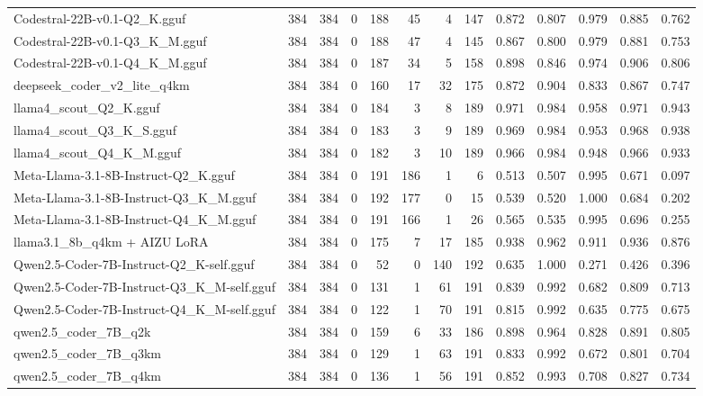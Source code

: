 \begin{table}[htbp]
{\begin{tabular}{lrrrrrrrrrrrr}
    Codestral-22B-v0.1-Q2\_K.gguf & 384 & 384 & 0 & 188 & 45 & 4 & 147 & 0.872 & 0.807 & 0.979 & 0.885 & 0.762 \\
    Codestral-22B-v0.1-Q3\_K\_M.gguf & 384 & 384 & 0 & 188 & 47 & 4 & 145 & 0.867 & 0.800 & 0.979 & 0.881 & 0.753 \\
    Codestral-22B-v0.1-Q4\_K\_M.gguf & 384 & 384 & 0 & 187 & 34 & 5 & 158 & 0.898 & 0.846 & 0.974 & 0.906 & 0.806 \\
    deepseek\_coder\_v2\_lite\_q4km & 384 & 384 & 0 & 160 & 17 & 32 & 175 & 0.872 & 0.904 & 0.833 & 0.867 & 0.747 \\
    llama4\_scout\_Q2\_K.gguf & 384 & 384 & 0 & 184 & 3 & 8 & 189 & 0.971 & 0.984 & 0.958 & 0.971 & \cellcolor{green!20}0.943 \\
    llama4\_scout\_Q3\_K\_S.gguf & 384 & 384 & 0 & 183 & 3 & 9 & 189 & 0.969 & 0.984 & 0.953 & 0.968 & 0.938 \\
    llama4\_scout\_Q4\_K\_M.gguf & 384 & 384 & 0 & 182 & 3 & 10 & 189 & 0.966 & 0.984 & 0.948 & 0.966 & 0.933 \\
    Meta-Llama-3.1-8B-Instruct-Q2\_K.gguf & 384 & 384 & 0 & 191 & 186 & 1 & 6 & 0.513 & 0.507 & 0.995 & 0.671 & 0.097 \\
    Meta-Llama-3.1-8B-Instruct-Q3\_K\_M.gguf & 384 & 384 & 0 & 192 & 177 & 0 & 15 & 0.539 & 0.520 & 1.000 & 0.684 & 0.202 \\
    Meta-Llama-3.1-8B-Instruct-Q4\_K\_M.gguf & 384 & 384 & 0 & 191 & 166 & 1 & 26 & 0.565 & 0.535 & 0.995 & 0.696 & 0.255 \\
    llama3.1\_8b\_q4km + AIZU LoRA & 384 & 384 & 0 & 175 & 7 & 17 & 185 & 0.938 & 0.962 & 0.911 & 0.936 & 0.876 \\
    Qwen2.5-Coder-7B-Instruct-Q2\_K-self.gguf & 384 & 384 & 0 & 52 & 0 & 140 & 192 & 0.635 & 1.000 & 0.271 & 0.426 & 0.396 \\
    Qwen2.5-Coder-7B-Instruct-Q3\_K\_M-self.gguf & 384 & 384 & 0 & 131 & 1 & 61 & 191 & 0.839 & 0.992 & 0.682 & 0.809 & 0.713 \\
    Qwen2.5-Coder-7B-Instruct-Q4\_K\_M-self.gguf & 384 & 384 & 0 & 122 & 1 & 70 & 191 & 0.815 & 0.992 & 0.635 & 0.775 & 0.675 \\
    qwen2.5\_coder\_7B\_q2k & 384 & 384 & 0 & 159 & 6 & 33 & 186 & 0.898 & 0.964 & 0.828 & 0.891 & 0.805 \\
    qwen2.5\_coder\_7B\_q3km & 384 & 384 & 0 & 129 & 1 & 63 & 191 & 0.833 & 0.992 & 0.672 & 0.801 & 0.704 \\
    qwen2.5\_coder\_7B\_q4km & 384 & 384 & 0 & 136 & 1 & 56 & 191 & 0.852 & 0.993 & 0.708 & 0.827 & 0.734 \\

\end{tabular}}
\end{table}
